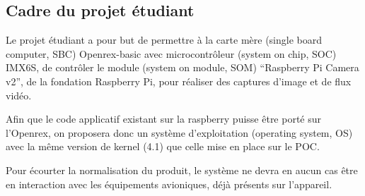 \subsection{Cadre du projet étudiant}

Le projet étudiant a pour but de permettre à la carte mère (single board computer, SBC) Openrex-basic
avec microcontrôleur (system on chip, SOC) IMX6S, de contrôler le module (system on module, SOM)
“Raspberry Pi Camera v2”, de la fondation Raspberry Pi, pour réaliser des captures d’image et de flux
vidéo. \medskip

Afin que le code applicatif existant sur la raspberry puisse être porté sur l’Openrex, on proposera
donc un système d’exploitation (operating system, OS) avec la même version de kernel (4.1) que celle
mise en place sur le POC.\medskip

Pour écourter la normalisation du produit, le système ne devra en aucun cas être en interaction avec
les équipements avioniques, déjà présents sur l’appareil.
